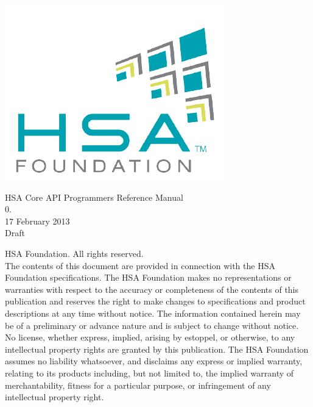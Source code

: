 \documentclass{book}
\begin{document}
\raggedright
\hypersetup{pageanchor=false,citecolor=blue}
\begin{titlepage}
\includegraphics[width=.5\textwidth]{fig/foundation.png}
\vspace*{7cm}
\begin{center}
{\Large H\-S\-A Core API Programmers Reference Manual\\[1ex]\large
0. }\\
\vspace*{1cm}
\vspace*{0.5cm}
{\small 17 February 2013}\\
\vspace*{0.5cm}
{\small Draft}\\
\end{center}
\end{titlepage}
\thispagestyle{empty}
{ HSA Foundation. All rights reserved.\\}
The contents of this document are provided in connection with the
HSA Foundation specifications. The HSA Foundation makes no
representations or warranties with respect to the accuracy or
completeness of the contents of this publication and reserves the
right to make changes to specifications and product descriptions at
any time without notice. The information contained herein may be of
a preliminary or advance nature and is subject to change without
notice. No license, whether express, implied, arising by estoppel,
or otherwise, to any intellectual property rights are granted by
this publication. The HSA Foundation assumes no liability
whatsoever, and disclaims any express or implied warranty, relating
to its products including, but not limited to, the implied warranty
of merchantability, fitness for a particular purpose, or
infringement of any intellectual property right.
\clearpage
{}
\tableofcontents
{}
\clearpage

\setcounter{page}{1}
\end{document}
